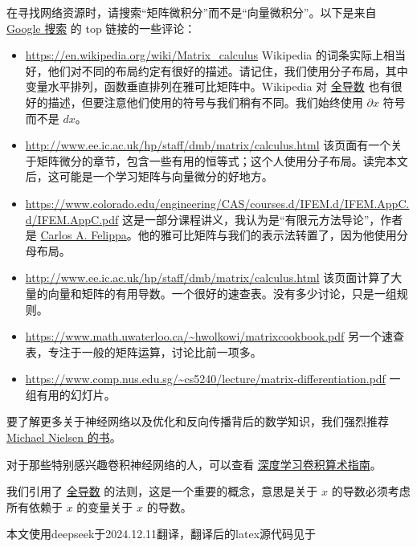 \documentclass[11pt]{article}
\begin{document}
在寻找网络资源时，请搜索“矩阵微积分”而不是“向量微积分”。以下是来自 \href{https://www.google.com/search?q=matrix+calculus\&oq=matrix+calculus}{Google 搜索} 的 top 链接的一些评论：
\begin{itemize}
\item \href{https://en.wikipedia.org/wiki/Matrix_calculus}{https://en.wikipedia.org/wiki/Matrix_calculus}
Wikipedia 的词条实际上相当好，他们对不同的布局约定有很好的描述。请记住，我们使用分子布局，其中变量水平排列，函数垂直排列在雅可比矩阵中。Wikipedia 对 \href{https://en.wikipedia.org/wiki/Total_derivative}{全导数} 也有很好的描述，但要注意他们使用的符号与我们稍有不同。我们始终使用 $\partial x$ 符号而不是 $dx$。
\item \href{http://www.ee.ic.ac.uk/hp/staff/dmb/matrix/calculus.html}{http://www.ee.ic.ac.uk/hp/staff/dmb/matrix/calculus.html}
该页面有一个关于矩阵微分的章节，包含一些有用的恒等式；这个人使用分子布局。读完本文后，这可能是一个学习矩阵与向量微分的好地方。
\item \href{https://www.colorado.edu/engineering/CAS/courses.d/IFEM.d/IFEM.AppC.d/IFEM.AppC.pdf}{https://www.colorado.edu/engineering/CAS/courses.d/IFEM.d/IFEM.AppC.d/IFEM.AppC.pdf}
这是一部分课程讲义，我认为是“有限元方法导论”，作者是 \href{https://www.colorado.edu/engineering/CAS/courses.d/IFEM.d}{Carlos A. Felippa}。他的雅可比矩阵与我们的表示法转置了，因为他使用分母布局。
\item \href{http://www.ee.ic.ac.uk/hp/staff/dmb/matrix/calculus.html}{http://www.ee.ic.ac.uk/hp/staff/dmb/matrix/calculus.html}
该页面计算了大量的向量和矩阵的有用导数。一个很好的速查表。没有多少讨论，只是一组规则。
\item \href{https://www.math.uwaterloo.ca/~hwolkowi/matrixcookbook.pdf}{https://www.math.uwaterloo.ca/\textasciitilde{}hwolkowi/matrixcookbook.pdf}
另一个速查表，专注于一般的矩阵运算，讨论比前一项多。
\item \href{https://www.comp.nus.edu.sg/~cs5240/lecture/matrix-differentiation.pdf}{https://www.comp.nus.edu.sg/\textasciitilde{}cs5240/lecture/matrix-differentiation.pdf}
一组有用的幻灯片。
\end{itemize}
要了解更多关于神经网络以及优化和反向传播背后的数学知识，我们强烈推荐 \href{http://neuralnetworksanddeeplearning.com/chap1.html}{Michael Nielsen 的书}。

对于那些特别感兴趣卷积神经网络的人，可以查看 \href{https://arxiv.org/pdf/1603.07285.pdf}{深度学习卷积算术指南}。

我们引用了 \href{https://en.wikipedia.org/wiki/Total_derivative}{全导数} 的法则，这是一个重要的概念，意思是关于 $x$ 的导数必须考虑所有依赖于 $x$ 的变量关于 $x$ 的导数。





本文使用deepseek于2024.12.11翻译，翻译后的latex源代码见于\href{}{}
\end{document}

